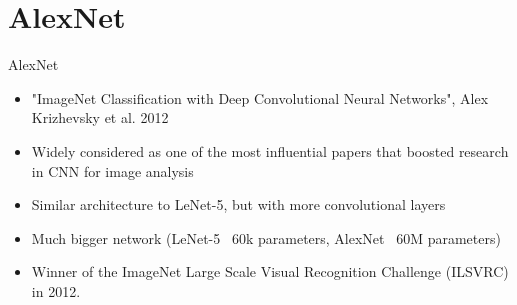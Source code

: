 \documentclass[9pt, aspectratio=169]{beamer}
\begin{document}
\section{AlexNet}
\begin{frame}
    {AlexNet}
    \begin{itemize}
        \item "ImageNet Classification with Deep Convolutional
              Neural Networks", Alex Krizhevsky et al. 2012
        \item Widely considered as one of the most influential papers that boosted research in CNN for image analysis
        \item Similar architecture to LeNet-5, but with more convolutional layers
        \item Much bigger network (LeNet-5 ~60k parameters, AlexNet ~60M parameters)
        \item Winner of the ImageNet Large Scale Visual Recognition Challenge (ILSVRC) in 2012.
    \end{itemize}
\end{frame}
\end{document}
